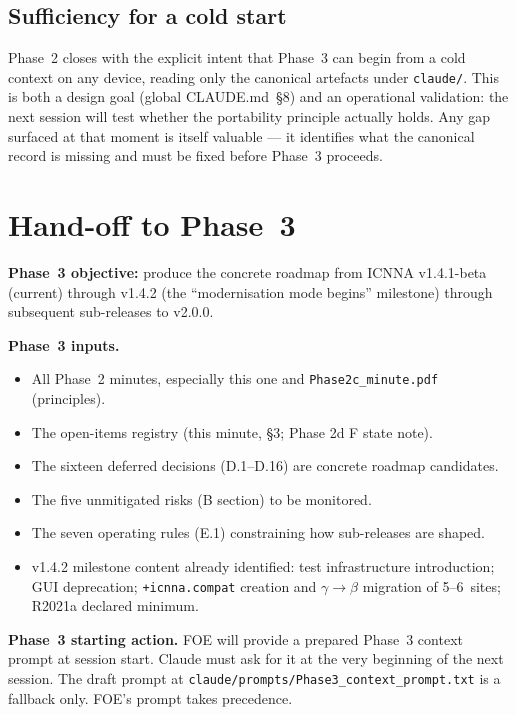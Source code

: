 \documentclass[11pt,a4paper]{article}
\begin{document}
\subsection{Sufficiency for a cold start}

Phase~2 closes with the explicit intent that Phase~3 can begin from a cold context on any device, reading only the canonical artefacts under \texttt{claude/}. This is both a design goal (global CLAUDE.md~§8) and an operational validation: the next session will test whether the portability principle actually holds. Any gap surfaced at that moment is itself valuable --- it identifies what the canonical record is missing and must be fixed before Phase~3 proceeds.

\section{Hand-off to Phase~3}

\textbf{Phase~3 objective:} produce the concrete roadmap from ICNNA v1.4.1-beta (current) through v1.4.2 (the ``modernisation mode begins'' milestone) through subsequent sub-releases to v2.0.0.

\textbf{Phase~3 inputs.}
\begin{itemize}
    \item All Phase~2 minutes, especially this one and \texttt{Phase2c\_minute.pdf} (principles).
    \item The open-items registry (this minute, §3; Phase 2d F state note).
    \item The sixteen deferred decisions (D.1--D.16) are concrete roadmap candidates.
    \item The five unmitigated risks (B section) to be monitored.
    \item The seven operating rules (E.1) constraining how sub-releases are shaped.
    \item v1.4.2 milestone content already identified: test infrastructure introduction; GUI deprecation; \texttt{+icnna.compat} creation and $\gamma \to \beta$ migration of 5--6~sites; R2021a declared minimum.
\end{itemize}

\textbf{Phase~3 starting action.} FOE will provide a prepared Phase~3 context prompt at session start. Claude must ask for it at the very beginning of the next session. The draft prompt at \texttt{claude/prompts/Phase3\_context\_prompt.txt} is a fallback only. FOE's prompt takes precedence.
\end{document}
